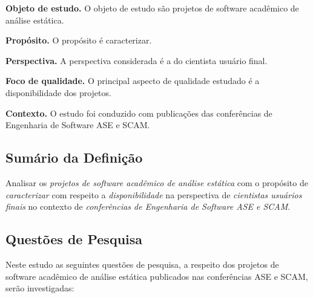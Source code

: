 \begin{description}
\item{\bf Objeto de estudo.} 
O objeto de estudo são projetos de software acadêmico de análise estática.

\item{\bf Propósito.} 
O propósito é caracterizar.

\item{\bf Perspectiva.} 
A perspectiva considerada é a do cientista usuário final.

\item{\bf Foco de qualidade.} 
O principal aspecto de qualidade estudado é a disponibilidade dos projetos.

\item{\bf Contexto.} 
O estudo foi conduzido com publicações das conferências de Engenharia de Software ASE e SCAM.

\end{description}

\subsection{Sumário da Definição}

Analisar os \textit{projetos de software acadêmico de análise estática}
com o propósito de \textit{caracterizar}
com respeito a \textit{disponibilidade}
na perspectiva de \textit{cientistas usuários finais}
no contexto de \textit{conferências de Engenharia de Software ASE e SCAM}.

\subsection{Questões de Pesquisa}

Neste estudo as seguintes questões de pesquisa, a respeito dos projetos de
software acadêmico de análise estática publicados nas conferências ASE e SCAM,
serão investigadas:

\newcommand{\EstudoUmQuestaoUm}{
  Os projetos de software acadêmico de análise estática publicados nas conferências ASE e SCAM possuem alguma presença oficial online?
}
\newcommand{\EstudoUmQuestaoDois}{
  Os projetos de software academico de análise estática publicados nas conferências ASE e SCAM estão disponíveis para download?
}
\newcommand{\EstudoUmQuestaoTres}{
  É possível ter acesso ao código fonte dos projetos de software de análise estática publicados nas conferências ASE e SCAM?
}
\newcommand{\EstudoUmQuestaoQuatro}{
  Os projetos de software com código fonte disponível podem ser adaptados para atender necessidades emergentes?
}

